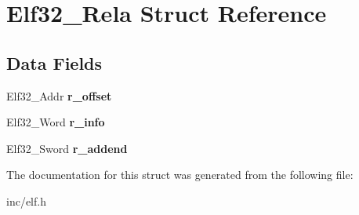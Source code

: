 \hypertarget{structElf32__Rela}{}\section{Elf32\+\_\+\+Rela Struct Reference}
\label{structElf32__Rela}
\subsection*{Data Fields}
\begin{DoxyCompactItemize}
\item 
Elf32\+\_\+\+Addr {\bfseries r\+\_\+offset}\hypertarget{structElf32__Rela_aa850a306ee7fa3935a9f8c3d1aae4e51}{}\label{structElf32__Rela_aa850a306ee7fa3935a9f8c3d1aae4e51}

\item 
Elf32\+\_\+\+Word {\bfseries r\+\_\+info}\hypertarget{structElf32__Rela_ac3a79d3f04209c33ddb4c36d07e68a79}{}\label{structElf32__Rela_ac3a79d3f04209c33ddb4c36d07e68a79}

\item 
Elf32\+\_\+\+Sword {\bfseries r\+\_\+addend}\hypertarget{structElf32__Rela_a1952286a900648afb9029c68a8bcea4d}{}\label{structElf32__Rela_a1952286a900648afb9029c68a8bcea4d}

\end{DoxyCompactItemize}


The documentation for this struct was generated from the following file\+:\begin{DoxyCompactItemize}
\item 
inc/elf.\+h\end{DoxyCompactItemize}
